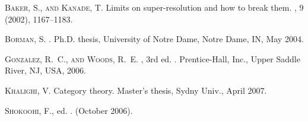 \begin{thebibliography}{10}
\begin{LTRbibitems}
\resetlatinfont
{}
\textsc{ Baker, S., and Kanade, T.}
\newblock Limits on super-resolution and how to break them.
, 9 (2002),
  1167--1183.

\end{LTRbibitems}

\begin{LTRbibitems}
\resetlatinfont
{}
\textsc{ Borman, S.}
.
\newblock  Ph.D. thesis, University of Notre Dame, Notre Dame, IN, May 2004.

\end{LTRbibitems}

\begin{LTRbibitems}
\resetlatinfont
{}
\textsc{ Gonzalez, R.~C., and Woods, R.~E.}
, 3rd ed. .
\newblock Prentice-Hall, Inc., Upper Saddle River, NJ, USA, 2006.

\end{LTRbibitems}

\begin{LTRbibitems}
\resetlatinfont
{}
\textsc{ Khalighi, V.}
\newblock Category theory.
\newblock  Master's thesis, Sydny Univ., April 2007.

\end{LTRbibitems}

\begin{LTRbibitems}
\resetlatinfont
{}
\textsc{ Shokoohi, F.},  ed. .
 (October 2006).

\end{LTRbibitems}

\end{thebibliography}
